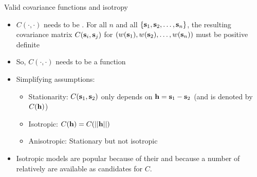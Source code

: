 \begin{frame}{Valid covariance functions and isotropy}
	
	\begin{itemize}
		
		\item $C(\cdot,\cdot)$ needs to be .  For all $n$ and all $\{\textbf{s}_{1}, \textbf{s}_{2},\ldots, \textbf{s}_{n}\}$, the resulting
		covariance matrix $C(\textbf{s}_i,\textbf{s}_j)$ for $(w(\textbf{s}_{1}), w(\textbf{s}_{2}),\ldots, w(\textbf{s}_{n}))$ must be positive definite
		
		\item So, $C(\cdot,\cdot)$ needs to be a  function
		
		\item Simplifying assumptions: 
		\begin{itemize}
			\item \alert{Stationarity:} $C(\textbf{s}_1,\textbf{s}_2)$ only depends on $\textbf{h} = \textbf{s}_1 - \textbf{s}_2$ (and is denoted by $C(\textbf{h})$)
			\item \alert{Isotropic:} $C(\textbf{h}) = C(||\textbf{h}||)$
			\item \alert{Anisotropic:} Stationary but not isotropic
		\end{itemize}
		
		\item Isotropic models are popular because of their  and because a number of relatively  are available as candidates for $C$.
		
	\end{itemize}
\end{frame}

